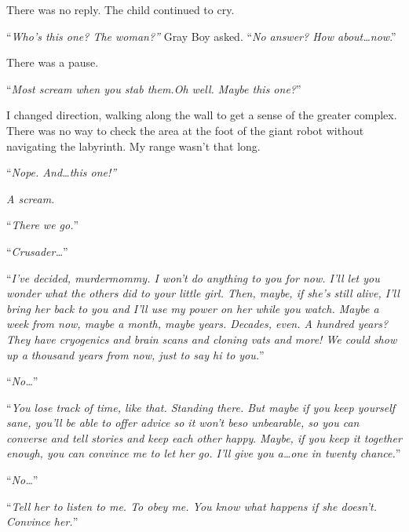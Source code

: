 There was no reply.  The child continued to cry.



``\emph{Who's this one?  The woman?'' } Gray Boy asked.  ``\emph{No answer?  How about\ldots now}.''



There was a pause.



``\emph{Most scream when you stab them.}\emph{Oh well.  Maybe this one?}''



I changed direction, walking along the wall to get a sense of the greater complex.  There was no way to check the area at the foot of the giant robot without navigating the labyrinth.  My range wasn't that long.



``\emph{Nope.  And\ldots this one!''}



\emph{A scream.}



``\emph{There we go.}''



``\emph{Crusader\ldots}''



``\emph{I've decided, murdermommy.  I won't do anything to you for now.  I'll let you wonder what the others did to your little girl.  Then, maybe, if she's still alive, I'll bring her back to you and I'll use my power on her while you watch.  Maybe a week from now, maybe a month, maybe years.  Decades, even.  A hundred years?  They have cryogenics and brain scans and cloning vats and more!  We could show up a thousand years from now, just to say hi to you.}''



``\emph{No\ldots}''



``\emph{You lose track of time, like that.  Standing there.  But maybe if you keep yourself sane, you'll be able to offer advice so it won't be}\emph{so unbearable, so you can converse and tell stories and keep each other happy}.\emph{  Maybe, if you keep it together enough, you can convince me to let her go.  I'll give you a\ldots one in twenty chance.}''



``\emph{No\ldots}''



``\emph{Tell her to listen to me.  To obey me.  You know what happens if she doesn't.  Convince her.}''




